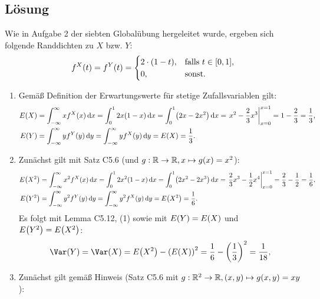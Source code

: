 \documentclass{exercise}
\begin{document}
    \subsection*{Lösung}
    Wie in Aufgabe 2 der siebten Globalübung hergeleitet wurde, ergeben sich folgende Randdichten zu \(X\) bzw. \(Y\):
    \[
        f^X\parentheses*{t} = f^Y\parentheses*{t} = \begin{cases}
            2 \cdot \parentheses*{1 - t}, & \text{falls }t \in \brackets*{0, 1},\\
            0, & \text{sonst}.
        \end{cases}
    \]
    \begin{enumerate}
        \item Gemäß Definition der Erwartungswerte für stetige Zufallsvariablen gilt:
        \begin{align*}
            E\parentheses*{X} &= \int_{-\infty}^\infty xf^X\parentheses*{x}\d x = \int_0^1 2x\parentheses*{1 - x}\d x = \int_0^1 \parentheses*{2x - 2x^2}\d x = \left.x^2 - \frac{2}{3}x^3\right|_{x = 0}^{x = 1} = 1 - \frac{2}{3} = \frac{1}{3},\\
            E\parentheses*{Y} &= \int_{-\infty}^\infty yf^Y\parentheses*{y}\d y = \int_{-\infty}^\infty yf^X\parentheses*{y}\d y = E\parentheses*{X} = \frac{1}{3}.
        \end{align*}
        \item Zunächst gilt mit Satz C5.6 (und \(g: \R \to \R, x \mapsto g\parentheses*{x} = x^2\)):
        \begin{align*}
            E\parentheses*{X^2} &= \int_{-\infty}^\infty x^2 f^X\parentheses*{x}\d x = \int_0^1 2x^2\parentheses*{1 - x}\d x = \int_0^1\parentheses*{2x^2 - 2x^3}\d x = \left.\frac{2}{3}x^3 - \frac{1}{2}x^4\right|_{x = 0}^{x = 1} = \frac{2}{3} - \frac{1}{2} = \frac{1}{6},\\
            E\parentheses*{Y^2} &= \int_{-\infty}^\infty y^2 f^Y\parentheses*{y}\d y = \int_{-\infty}^\infty y^2 f^X\parentheses*{y}\d y = E\parentheses*{X^2} = \frac{1}{6}.
        \end{align*}
        Es folgt mit Lemma C5.12, (1) sowie mit \(E\parentheses*{Y} = E\parentheses*{X}\) und \(E\parentheses*{Y^2} = E\parentheses*{X^2}\):
        \[
            \Var\parentheses*{Y} = \Var\parentheses*{X} = E\parentheses*{X^2} - \parentheses*{E\parentheses*{X}}^2 = \frac{1}{6} - \parentheses*{\frac{1}{3}}^2 = \frac{1}{18},
        \]
        \item Zunächst gilt gemäß Hinweis (Satz C5.6 mit \(g: \R^2 \to \R, \parentheses*{x, y} \mapsto g\parentheses*{x, y} = xy\)):

\end{enumerate}
\end{document}
